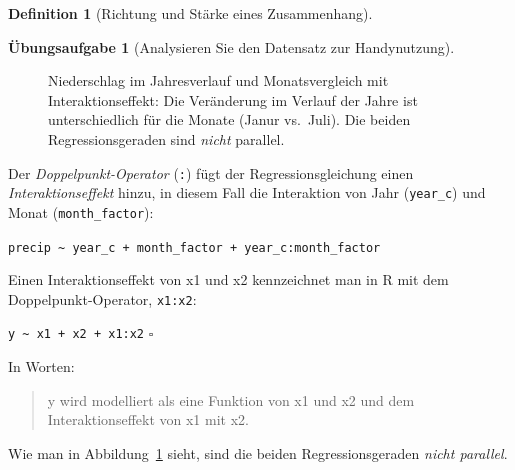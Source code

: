 \documentclass[
  a4paper,
  DIV=11]{scrreprt}
\theoremstyle{definition}
\newtheorem{exercise}{Übungsaufgabe}[chapter]
\theoremstyle{definition}
\theoremstyle{definition}
\newtheorem{definition}{Definition}[chapter]
\theoremstyle{remark}
\begin{document}
\begin{definition}[Richtung und Stärke eines
Zusammenhang]
\begin{exercise}[Analysieren Sie den Datensatz zur
Handynutzung]
\begin{figure}
{}

\caption{\label{fig-wetter-interakt}Niederschlag im Jahresverlauf und
Monatsvergleich mit Interaktionseffekt: Die Veränderung im Verlauf der
Jahre ist unterschiedlich für die Monate (Janur vs.~Juli). Die beiden
Regressionsgeraden sind \emph{nicht} parallel.}

\end{figure}%

Der \emph{Doppelpunkt-Operator} (\texttt{:}) fügt der
Regressionsgleichung einen \emph{Interaktionseffekt} hinzu, in diesem
Fall die Interaktion von Jahr (\texttt{year\_c}) und Monat
(\texttt{month\_factor}):

\texttt{precip\ \textasciitilde{}\ year\_c\ +\ month\_factor\ +\ year\_c:month\_factor}

\begin{tcolorbox}[enhanced jigsaw, leftrule=.75mm, opacitybacktitle=0.6, colback=white, colframe=quarto-callout-important-color-frame, coltitle=black, colbacktitle=quarto-callout-important-color!10!white, opacityback=0, left=2mm, breakable, titlerule=0mm, toptitle=1mm, bottomtitle=1mm, rightrule=.15mm, title=\textcolor{quarto-callout-important-color}{\faExclamation}\hspace{0.5em}{Wichtig}, arc=.35mm, bottomrule=.15mm, toprule=.15mm]

Einen Interaktionseffekt von x1 und x2 kennzeichnet man in R mit dem
Doppelpunkt-Operator, \texttt{x1:x2}:

\texttt{y\ \textasciitilde{}\ x1\ +\ x2\ +\ x1:x2} \(\square\)

\end{tcolorbox}

In Worten:

\begin{quote}
y wird modelliert als eine Funktion von x1 und x2 und dem
Interaktionseffekt von x1 mit x2.
\end{quote}

Wie man in Abbildung~\ref{fig-wetter-interakt} sieht, sind die beiden
Regressionsgeraden \emph{nicht parallel}.

\begin{tcolorbox}[enhanced jigsaw, leftrule=.75mm, opacitybacktitle=0.6, colback=white, colframe=quarto-callout-note-color-frame, coltitle=black, colbacktitle=quarto-callout-note-color!10!white, opacityback=0, left=2mm, breakable, titlerule=0mm, toptitle=1mm, bottomtitle=1mm, rightrule=.15mm, title=\textcolor{quarto-callout-note-color}{\faInfo}\hspace{0.5em}{Hinweis}, arc=.35mm, bottomrule=.15mm, toprule=.15mm]


\end{tcolorbox}
\end{exercise}
\end{definition}
\end{document}
